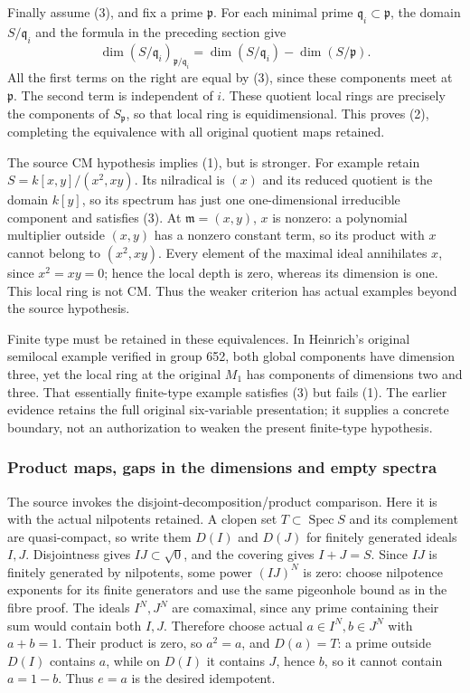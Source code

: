Finally assume (3), and fix a prime \(\mathfrak p\). For each minimal prime \(\mathfrak q_i\subset\mathfrak p\), the domain \(S/\mathfrak q_i\) and the formula in the preceding section give \[
 \dim (S/\mathfrak q_i)_{\mathfrak p/\mathfrak q_i}
   =\dim(S/\mathfrak q_i)-\dim(S/\mathfrak p).
\] All the first terms on the right are equal by (3), since these components meet at \(\mathfrak p\). The second term is independent of \(i\). These quotient local rings are precisely the components of \(S_{\mathfrak p}\), so that local ring is equidimensional. This proves (2), completing the equivalence with all original quotient maps retained.

The source CM hypothesis implies (1), but is stronger. For example retain \(S=k[x,y]/(x^2,xy)\). Its nilradical is \((x)\) and its reduced quotient is the domain \(k[y]\), so its spectrum has just one one-dimensional irreducible component and satisfies (3). At \(\mathfrak m=(x,y)\), \(x\) is nonzero: a polynomial multiplier outside \((x,y)\) has a nonzero constant term, so its product with \(x\) cannot belong to \((x^2,xy)\). Every element of the maximal ideal annihilates \(x\), since \(x^2=xy=0\); hence the local depth is zero, whereas its dimension is one. This local ring is not CM. Thus the weaker criterion has actual examples beyond the source hypothesis.

Finite type must be retained in these equivalences. In Heinrich's original semilocal example verified in group 652, both global components have dimension three, yet the local ring at the original \(M_1\) has components of dimensions two and three. That essentially finite-type example satisfies (3) but fails (1). The earlier evidence retains the full original six-variable presentation; it supplies a concrete boundary, not an authorization to weaken the present finite-type hypothesis.

\subsubsection{Product maps, gaps in the dimensions and empty spectra}\label{product-maps-gaps-in-the-dimensions-and-empty-spectra}

The source invokes the disjoint-decomposition/product comparison. Here it is with the actual nilpotents retained. A clopen set \(T\subset\operatorname{Spec}S\) and its complement are quasi-compact, so write them \(D(I)\) and \(D(J)\) for finitely generated ideals \(I,J\). Disjointness gives \(IJ\subset\sqrt0\), and the covering gives \(I+J=S\). Since \(IJ\) is finitely generated by nilpotents, some power \((IJ)^N\) is zero: choose nilpotence exponents for its finite generators and use the same pigeonhole bound as in the fibre proof. The ideals \(I^N,J^N\) are comaximal, since any prime containing their sum would contain both \(I,J\). Therefore choose actual \(a\in I^N,b\in J^N\) with \(a+b=1\). Their product is zero, so \(a^2=a\), and \(D(a)=T\): a prime outside \(D(I)\) contains \(a\), while on \(D(I)\) it contains \(J\), hence \(b\), so it cannot contain \(a=1-b\). Thus \(e=a\) is the desired idempotent.

